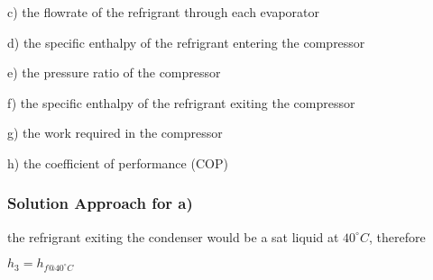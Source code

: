 \documentclass[letterpaper,10pt,english]{jupyterBook}
\begin{document}
\sphinxAtStartPar
c) the flow\sphinxhyphen{}rate of the refrigrant through each evaporator

\sphinxAtStartPar
d) the specific enthalpy of the refrigrant entering the compressor

\sphinxAtStartPar
e) the pressure ratio of the compressor

\sphinxAtStartPar
f) the specific enthalpy of the refrigrant exiting the compressor

\sphinxAtStartPar
g) the work required in the compressor

\sphinxAtStartPar
h) the coefficient of performance (COP)

\sphinxAtStartPar
{}


\subsubsection{Solution Approach for a)}
\label{\detokenize{notebooks/Chapter5/CH5-Q8:solution-approach-for-a}}
\sphinxAtStartPar
the refrigrant exiting the condenser would be a sat liquid at \(40^{\circ} C\), therefore

\sphinxAtStartPar
\(h_3=h_{f@40^{\circ} C}\)
\end{document}

